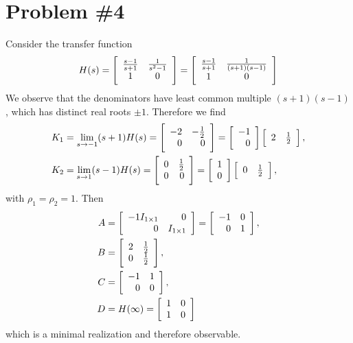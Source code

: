 \documentclass{article}
\begin{document}
\section*{Problem \#4}
Consider the transfer function
$$
H(s) =
\left[\begin{array}{c c}
  \frac{s-1}{s+1} & \frac{1}{s^2 - 1} \\
  1               & 0
\end{array}\right] =
\left[\begin{array}{c c}
  \frac{s-1}{s+1} & \frac{1}{(s+1)(s-1)} \\
  1               & 0
\end{array}\right]
$$
We observe that the denominators have least common multiple
$(s+1)(s-1)$, which has distinct real roots $\pm 1$. Therefore we find
\begin{align*}
K_1 &= \lim_{s \to -1} (s + 1)H(s) =
\left[\begin{array}{r r}
 -2 & -\frac{1}{2} \\
  0 & 0
\end{array}\right] =
\left[\begin{array}{r}
 -1 \\
  0
\end{array}\right]
\left[\begin{array}{r r}
  2 & \frac{1}{2}
\end{array}\right], \\
K_2 &= \lim_{s \to 1} (s - 1)H(s) =
\left[\begin{array}{r r}
  0 & \frac{1}{2} \\
  0 & 0
\end{array}\right] =
\left[\begin{array}{r}
  1 \\
  0
\end{array}\right]
\left[\begin{array}{r r}
  0 & \frac{1}{2}
\end{array}\right],
\end{align*}
with $\rho_1 = \rho_2 = 1$. Then
\begin{align*}
A &=
\left[\begin{array}{r r}
 -1 I_{1 \times 1} & 0 \\
  0                & I_{1 \times 1}
\end{array}\right] =
\left[\begin{array}{r r}
 -1 & 0 \\
  0 & 1
\end{array}\right], \\
B &=
\left[\begin{array}{r r}
  2 & \frac{1}{2} \\
  0 & \frac{1}{2}
\end{array}\right], \\
C &=
\left[\begin{array}{r r}
 -1 & 1 \\
  0 & 0
\end{array}\right], \\
D &= H(\infty) =
\left[\begin{array}{r r}
  1 & 0 \\
  1 & 0
\end{array}\right]
\end{align*}
which is a minimal realization and therefore observable.
\end{document}
